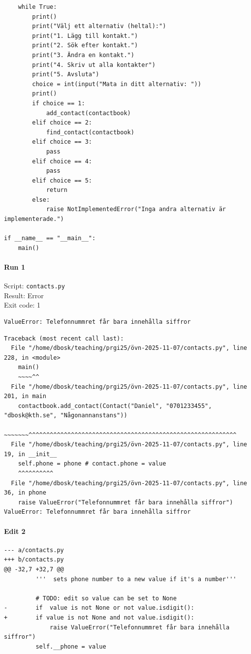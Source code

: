 \documentclass{article}
\begin{document}
\begin{verbatim}
    while True:
        print()
        print("Välj ett alternativ (heltal):")
        print("1. Lägg till kontakt.")
        print("2. Sök efter kontakt.")
        print("3. Ändra en kontakt.")
        print("4. Skriv ut alla kontakter")
        print("5. Avsluta")
        choice = int(input("Mata in ditt alternativ: "))
        print()
        if choice == 1:
            add_contact(contactbook)
        elif choice == 2:
            find_contact(contactbook)
        elif choice == 3:
            pass
        elif choice == 4:
            pass
        elif choice == 5:
            return
        else:
            raise NotImplementedError("Inga andra alternativ är implementerade.")

if __name__ == "__main__":
    main()
\end{verbatim}

\noindent
\begin{minipage}[t]{0.48\linewidth}
\paragraph{Run 1}
Script: \texttt{contacts.py} \\
Result: Error \\
Exit code: 1

\begin{verbatim}
ValueError: Telefonnummret får bara innehålla siffror
\end{verbatim}

\begin{verbatim}
Traceback (most recent call last):
  File "/home/dbosk/teaching/prgi25/övn-2025-11-07/contacts.py", line 228, in <module>
    main()
    ~~~~^^
  File "/home/dbosk/teaching/prgi25/övn-2025-11-07/contacts.py", line 201, in main
    contactbook.add_contact(Contact("Daniel", "0701233455", "dbosk@kth.se", "Någonannanstans"))
                            ~~~~~~~^^^^^^^^^^^^^^^^^^^^^^^^^^^^^^^^^^^^^^^^^^^^^^^^^^^^^^^^^^^
  File "/home/dbosk/teaching/prgi25/övn-2025-11-07/contacts.py", line 19, in __init__
    self.phone = phone # contact.phone = value
    ^^^^^^^^^^
  File "/home/dbosk/teaching/prgi25/övn-2025-11-07/contacts.py", line 36, in phone
    raise ValueError("Telefonnummret får bara innehålla siffror")
ValueError: Telefonnummret får bara innehålla siffror
\end{verbatim}
\end{minipage}
\hfill
\begin{minipage}[t]{0.48\linewidth}
\paragraph{Edit 2}
\begin{verbatim}
--- a/contacts.py
+++ b/contacts.py
@@ -32,7 +32,7 @@
         '''  sets phone number to a new value if it's a number'''
 
         # TODO: edit so value can be set to None
-        if  value is not None or not value.isdigit():
+        if value is not None and not value.isdigit():
             raise ValueError("Telefonnummret får bara innehålla siffror")
         self.__phone = value
\end{verbatim}
\end{minipage}
\end{document}
